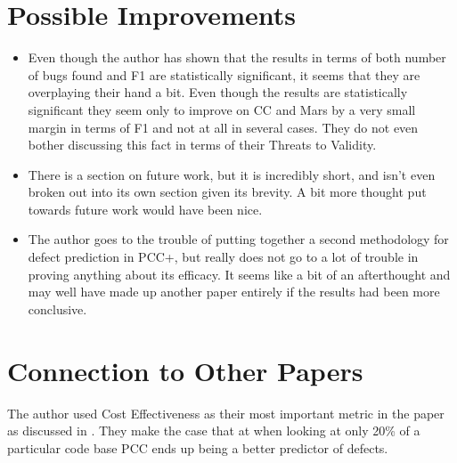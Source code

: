 \documentclass[english]{article}
\begin{document}
\section*{Possible Improvements}
\begin{itemize}
\item Even though the author has shown that the results in terms of both number of bugs found and F1 are statistically significant, it seems that they are overplaying their hand a bit.  Even though the results are statistically significant they seem only to improve on CC and Mars by a very small margin in terms of F1 and not at all in several cases.  They do not even bother discussing this fact in terms of their Threats to Validity.
\item There is a section on future work, but it is incredibly short, and isn't even broken out into its own section given its brevity.  A bit more thought put towards future work would have been nice.
\item The author goes to the trouble of putting together a second methodology for defect prediction in PCC+, but really does not go to a lot of trouble in proving anything about its efficacy.  It seems like a bit of an afterthought and may well have made up another paper entirely if the results had been more conclusive. 
\end{itemize}

\section*{Connection to Other Papers}
The author used Cost Effectiveness as their most important metric in the paper as discussed in \cite{Rahman}.  They make the case that at when looking at only 20\% of a particular code base PCC ends up being a better predictor of defects.



\end{document}

